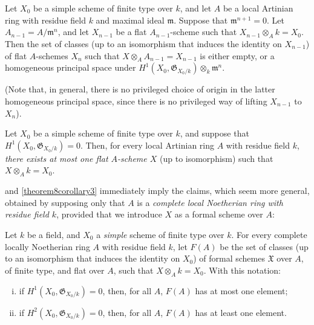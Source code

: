 \documentclass{article}
\theoremstyle{plain}
\newenvironment{theorem}[1]
  {\renewcommand\theinnercustomtheorem{#1}\innercustomtheorem}
  {\endinnercustomtheorem}
\newenvironment{corollary}[1]
  {\renewcommand\theinnercustomcorollary{#1}\innercustomcorollary}
  {\endinnercustomcorollary}
\theoremstyle{definition}
\newcommand{\fk}{\mathfrak}
\newcommand{\oldpage}[1]{\marginpar{\footnotesize$\Big\vert$ \textit{p.~#1}}}
\begin{document}
\begin{corollary}{2}
\label{theorem8corollary2}
  Let $X_0$ be a simple scheme of finite type over $k$, and let $A$ be a local Artinian ring with residue field $k$ and maximal ideal $\fk{m}$.
  Suppose that $\fk{m}^{n+1}=0$.
  Let $A_{n-1}=A/\fk{m}^n$, and let $X_{n-1}$ be a flat $A_{n-1}$-scheme such that $X_{n-1}\otimes_Ak=X_0$.
  Then the set of classes (up to an isomorphism that induces the identity on $X_{n-1}$) of flat $A$-schemes $X_n$ such that $X\otimes_AA_{n-1}=X_{n-1}$ is either empty, or a homogeneous principal space under $H^1(X_0,\fk{G}_{X_0/k})\otimes_k\fk{m}^n$.
\end{corollary}

(Note that, in general, there is no privileged choice of origin in the latter homogeneous principal space, since there is no privileged way of lifting $X_{n-1}$ to $X_n$).

\begin{corollary}{3}
\label{theorem8corollary3}
  Let $X_0$ be a simple scheme of finite type over $k$, and suppose that $H^1(X_0,\fk{G}_{X_0/k})=0$.
  Then, for every local Artinian ring $A$ with residue field $k$, \emph{there exists at most one flat $A$-scheme $X$} (up to isomorphism) such that $X\otimes_Ak=X_0$.
\end{corollary}

 and \cref{theorem8corollary3} immediately imply the claims, which seem more general, obtained by supposing only that $A$ is a \emph{complete local Noetherian ring with residue field $k$}, provided that we introduce $X$ as a formal scheme over $A$:

\begin{theorem}{9}
\label{theorem9}
  Let $k$ be a field, and $X_0$ a \emph{simple} scheme of finite type over $k$.
  For every complete locally Noetherian ring $A$ with residue field $k$, let $F(A)$ be the set of classes (up to an isomorphism that induces the identity on $X_0$)
\oldpage{182-14}
  of formal schemes $\fk{X}$ over $A$, of finite type, and flat over $A$, such that $X\otimes_Ak=X_0$.
  With this notation:
  \begin{enumerate}[i.]
    \item if $H^1(X_0,\fk{G}_{X_0/k})=0$, then, for all $A$, $F(A)$ has at most one element;
    \item if $H^2(X_0,\fk{G}_{X_0/k})=0$, then, for all $A$, $F(A)$ has at least one element.
  \end{enumerate}
\end{theorem}
\end{document}
